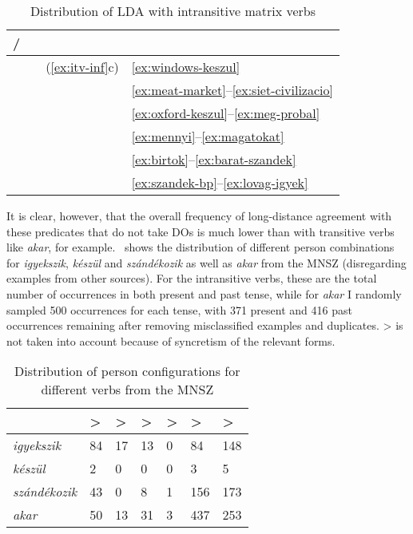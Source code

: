 \begin{table}[htpb]
    \centering
    \begin{tabular}{llll}
    \toprule
    \Sbj{} / \Obj{} & \First{} & \Second{}           & \Third{} \\
    \midrule
    \Fsg{}          &          & (\ref{ex:itv-inf}c) & \eqref{ex:windows-keszul} \\
    \Fpl{}          &          &                     & \eqref{ex:meat-market}--\eqref{ex:siet-civilizacio}\\
    \Ssg{}          &          &                     & \eqref{ex:oxford-keszul}--\eqref{ex:meg-probal}\\
    \Spl{}          &          &                     & \eqref{ex:mennyi}--\eqref{ex:magatokat} \\
    \Tsg{}          &          &                     & \eqref{ex:birtok}--\eqref{ex:barat-szandek} \\
    \Tpl{}          &          &                     & \eqref{ex:szandek-bp}--\eqref{ex:lovag-igyek} \\
    \bottomrule
    \end{tabular}
    \caption{Distribution of LDA with intransitive matrix
    verbs}\label{tb:lda-distr}
\end{table}

It is clear, however, that the overall frequency of long-distance agreement
with these predicates that do not take \Acc{} \glspl{DO} is much lower than
with transitive verbs like \emph{akar}, for
example.~ shows the distribution of different
person combinations for \emph{igyekszik}, \emph{készül} and
\emph{szán\-dé\-kozik} as well as \emph{akar} from the \gls{MNSZ} (disregarding
examples from other sources). For the intransitive verbs, these are the total
number of occurrences in both present and past tense, while for \emph{akar} I
randomly sampled 500 occurrences for each tense, with 371 present and
416 past occurrences remaining after removing misclassified examples and
duplicates. \Fsg>\Third{} is not taken into account because of syncretism of
the relevant forms.

\begin{table}[htpb]
    \centering
    \begin{tabular}{lllllll}
    \toprule
        & \Fpl{}>\Third{} & \Fsg{}>\Second{} & \Ssg{}>\Third{} & \Spl{}>\Third{} & \Tsg{}>\Third{} & \Tpl{}>\Third{} \\
    \midrule
    \emph{igyekszik} & 84 & 17 & 13 & 0 & 84 & 148\\
    \emph{készül} & 2 & 0 & 0 & 0 & 3 & 5 \\
    \emph{szándékozik} & 43 & 0 & 8 & 1 & 156 & 173\\
    \midrule
    \emph{akar} & 50 & 13 & 31 & 3 & 437 & 253\\
    \bottomrule
    \end{tabular}
    \caption{Distribution of person configurations for different verbs
    from the \gls{MNSZ}}\label{tb:mnsz-person-counts}
\end{table}

